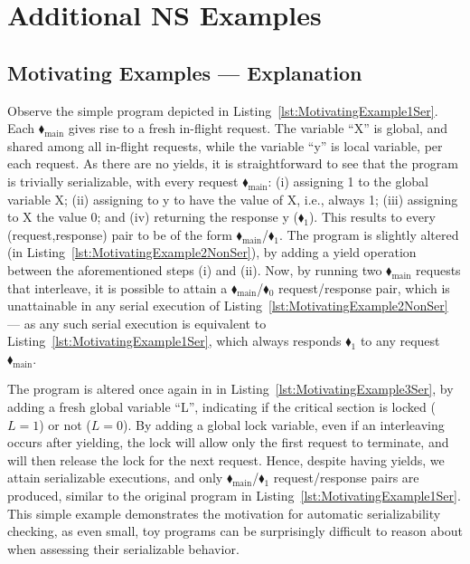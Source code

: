 \appendix

\section{Additional NS Examples}
\label{appendix:MoreNsExamples}


\subsection{Motivating Examples --- Explanation}


Observe the simple program depicted in Listing~\ref{lst:MotivatingExample1Ser}. Each  {\color{ForestGreen}$\blacklozenge_\text{main}$} gives rise to a fresh in-flight request. The variable ``X'' is global, and shared among all in-flight requests, while the variable ``y'' is local variable, per each request. 
%
As there are no yields, it is straightforward to see that the program is trivially serializable, with every request {\color{ForestGreen}$\blacklozenge_\text{main}$}: (i) assigning 1 to the global variable X; (ii) assigning to y to have the value of X, i.e., always 1; (iii) assigning to X the value 0; and (iv) returning the response y ({\color{red}$\blacklozenge_1$}). This results to every (request,response) pair to be of the form {\color{ForestGreen}$\blacklozenge_\text{main}$}/{\color{red}$\blacklozenge_1$}.
%
The program is slightly altered (in Listing~\ref{lst:MotivatingExample2NonSer}), by adding a yield operation between the aforementioned steps (i) and (ii). Now, by running two {\color{ForestGreen}$\blacklozenge_\text{main}$} requests that interleave, it is possible to attain a {\color{ForestGreen}$\blacklozenge_\text{main}$}/{\color{red}$\blacklozenge_0$} request/response pair, which is unattainable in any serial execution of Listing~\ref{lst:MotivatingExample2NonSer} --- as any such serial execution is equivalent to Listing~\ref{lst:MotivatingExample1Ser}, which always responds {\color{red}$\blacklozenge_1$} to any request {\color{ForestGreen}$\blacklozenge_\text{main}$}.


The program is altered once again in in Listing~\ref{lst:MotivatingExample3Ser}, by adding a fresh global variable ``L'', indicating if the critical section is locked ($L=1$) or not ($L=0$).
By adding a global lock variable, even if an interleaving occurs after yielding, the lock will allow only the first request to terminate, and will then release the lock for the next request. Hence, despite having yields, we attain serializable executions, and only {\color{ForestGreen}$\blacklozenge_\text{main}$}/{\color{red}$\blacklozenge_1$} request/response pairs are produced, similar to the original program in Listing~\ref{lst:MotivatingExample1Ser}.
%
This simple example demonstrates the motivation for automatic serializability checking, as even small, toy programs can be surprisingly difficult to reason about when assessing their serializable behavior.



